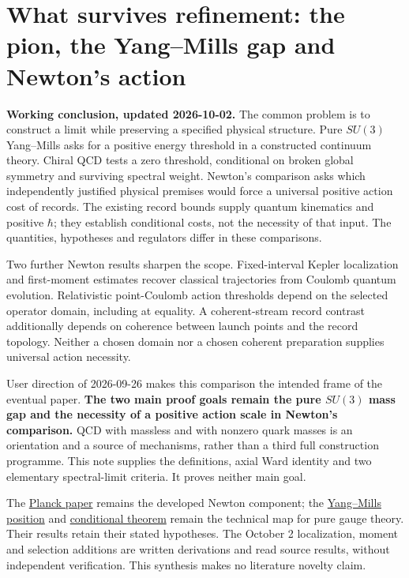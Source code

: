 \documentclass[11pt,a4paper]{article}
\begin{document}
\hypertarget{what-survives-refinement-the-pion-the-yangmills-gap-and-newtons-action}{%
\section{What survives refinement: the pion, the Yang--Mills gap and
Newton's
action}\label{what-survives-refinement-the-pion-the-yangmills-gap-and-newtons-action}}

\textbf{Working conclusion, updated 2026-10-02.} The common problem is
to construct a limit while preserving a specified physical structure.
Pure \(SU(3)\) Yang--Mills asks for a positive energy threshold in a
constructed continuum theory. Chiral QCD tests a zero threshold,
conditional on broken global symmetry and surviving spectral weight.
Newton's comparison asks which independently justified physical premises
would force a universal positive action cost of records. The existing
record bounds supply quantum kinematics and positive \(\hbar\); they
establish conditional costs, not the necessity of that input. The
quantities, hypotheses and regulators differ in these comparisons.

Two further Newton results sharpen the scope. Fixed-interval Kepler
localization and first-moment estimates recover classical trajectories
from Coulomb quantum evolution. Relativistic point-Coulomb action
thresholds depend on the selected operator domain, including at
equality. A coherent-stream record contrast additionally depends on
coherence between launch points and the record topology. Neither a
chosen domain nor a chosen coherent preparation supplies universal
action necessity.

User direction of 2026-09-26 makes this comparison the intended frame of
the eventual paper. \textbf{The two main proof goals remain the pure
\(SU(3)\) mass gap and the necessity of a positive action scale in
Newton's comparison.} QCD with massless and with nonzero quark masses is
an orientation and a source of mechanisms, rather than a third full
construction programme. This note supplies the definitions, axial Ward
identity and two elementary spectral-limit criteria. It proves neither
main goal.

The \href{planck-gap-paper.md}{Planck paper} remains the developed
Newton component; the
\href{mass-gap-obligations-lattice.md\#existing-estimates-and-examined-routes}{Yang--Mills
position} and \href{mass-gap-conditional-theorem.md}{conditional
theorem} remain the technical map for pure gauge theory. Their results
retain their stated hypotheses. The October 2 localization, moment and
selection additions are written derivations and read source results,
without independent verification. This synthesis makes no literature
novelty claim.
\end{document}
